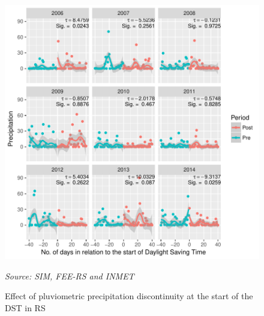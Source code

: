 \documentclass[12pt,openright,oneside,a4paper,english,french,spanish]{abntex2}
\numberwithin{table}{section} %
\numberwithin{figure}{section} %
\newcommand{\source}[1]{\textit{#1}}
\begin{document}
\begin{otherlanguage}{english}
\begin{subappendices}
\begin{figure}[H]
\begin{center}
\includegraphics{TESE_DE_DOUTORADO_RENAN_FINAL-plot_efeito_descontinuo_prec_entrada}
\end{center}
\caption{Effect of pluviometric precipitation discontinuity at the start of the DST in RS}
\source{Source: SIM, FEE-RS and INMET}
\label{fig:efeito_descon_prec_entrada_RS}
\end{figure}



\end{subappendices}
\end{otherlanguage}
\end{document}
